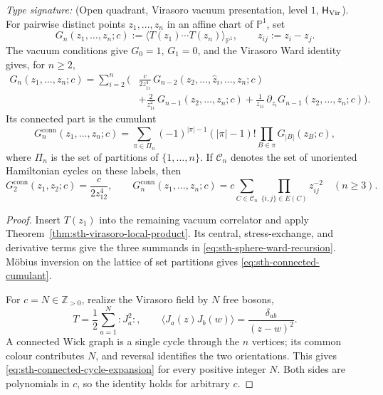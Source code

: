 \begin{theorem}
\ClaimStatusProvedHere
\label{thm:sth-virasoro-ward-correlators}
\emph{Type signature:}
\textup{(Open quadrant, Virasoro vacuum presentation, level \(1\),
\(\mathsf H_{\mathrm{Vir}}\)).}
For pairwise distinct points \(z_1,\ldots,z_n\) in an affine chart of
\(\mathbb P^1\), set
\[
 G_n(z_1,\ldots,z_n;c)
 :=\langle T(z_1)\cdots T(z_n)\rangle_{\mathbb P^1},\qquad
 z_{ij}:=z_i-z_j.
\]
The vacuum conditions give \(G_0=1\), \(G_1=0\), and the Virasoro Ward
identity gives, for \(n\geq2\),
\begin{equation}
\begin{split}
G_n(z_1,\ldots,z_n;c)
=\sum_{i=2}^n\biggl(&\frac{c}{2z_{1i}^4}\,
G_{n-2}(z_2,\ldots,\widehat z_i,\ldots,z_n;c)\\
&+\frac{2}{z_{1i}^2}\,G_{n-1}(z_2,\ldots,z_n;c)
+\frac{1}{z_{1i}}\,\partial_{z_i}
G_{n-1}(z_2,\ldots,z_n;c)\biggr).
\end{split}
\label{eq:sth-sphere-ward-recursion}
\end{equation}
Its connected part is the cumulant
\begin{equation}
 G_n^{\mathrm{conn}}(z_1,\ldots,z_n;c)
 =\sum_{\pi\in\Pi_n}(-1)^{|\pi|-1}(|\pi|-1)!
 \prod_{B\in\pi}G_{|B|}(z_B;c),
 \label{eq:sth-connected-cumulant}
\end{equation}
where \(\Pi_n\) is the set of partitions of
\(\{1,\ldots,n\}\).  If \(\mathcal C_n\) denotes the set of unoriented
Hamiltonian cycles on these labels, then
\begin{equation}
 G_2^{\mathrm{conn}}(z_1,z_2;c)=\frac{c}{2z_{12}^4},\qquad
 G_n^{\mathrm{conn}}(z_1,\ldots,z_n;c)
 =c\sum_{C\in\mathcal C_n}\prod_{\{i,j\}\in E(C)}z_{ij}^{-2}
 \quad(n\geq3).
 \label{eq:sth-connected-cycle-expansion}
\end{equation}
\end{theorem}

\begin{proof}
Insert \(T(z_1)\) into the remaining vacuum correlator and apply
Theorem~\ref{thm:sth-virasoro-local-product}.  Its central,
stress-exchange, and derivative terms give the three summands in
\eqref{eq:sth-sphere-ward-recursion}.  M\"obius inversion on the lattice
of set partitions gives \eqref{eq:sth-connected-cumulant}.

For \(c=N\in\mathbb Z_{>0}\), realize the Virasoro field by \(N\) free
bosons,
\[
 T=\frac12\sum_{a=1}^N{:}J_a^2{:},\qquad
 \langle J_a(z)J_b(w)\rangle=\frac{\delta_{ab}}{(z-w)^2}.
\]
A connected Wick graph is a single cycle through the \(n\) vertices;
its common colour contributes \(N\), and reversal identifies the two
orientations.  This gives \eqref{eq:sth-connected-cycle-expansion} for
every positive integer \(N\).  Both sides are polynomials in \(c\), so
the identity holds for arbitrary \(c\).
\end{proof}

